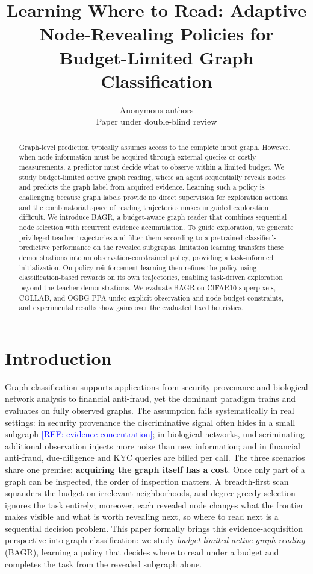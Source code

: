 \documentclass{article}
\title{Learning Where to Read: Adaptive Node-Revealing Policies for\\ Budget-Limited Graph Classification}
\author{Anonymous authors\\ Paper under double-blind review}
\newcommand{\refadd}[1]{\textcolor{blue}{[REF: #1]}}
\begin{document}
\maketitle

\begin{abstract}
Graph-level prediction typically assumes access to the complete input graph. However, when node information must be acquired through external queries or costly measurements, a predictor must decide what to observe within a limited budget. We study budget-limited active graph reading, where an agent sequentially reveals nodes and predicts the graph label from acquired evidence. Learning such a policy is challenging because graph labels provide no direct supervision for exploration actions, and the combinatorial space of reading trajectories makes unguided exploration difficult. We introduce BAGR, a budget-aware graph reader that combines sequential node selection with recurrent evidence accumulation. To guide exploration, we generate privileged teacher trajectories and filter them according to a pretrained classifier's predictive performance on the revealed subgraphs. Imitation learning transfers these demonstrations into an observation-constrained policy, providing a task-informed initialization. On-policy reinforcement learning then refines the policy using classification-based rewards on its own trajectories, enabling task-driven exploration beyond the teacher demonstrations. We evaluate BAGR on CIFAR10 superpixels, COLLAB, and OGBG-PPA under explicit observation and node-budget constraints, and experimental results show gains over the evaluated fixed heuristics.
\end{abstract}

\section{Introduction}
\label{sec:intro}

Graph classification supports applications from security provenance and biological network analysis to financial anti-fraud, yet the dominant paradigm trains and evaluates on fully observed graphs. The assumption fails systematically in real settings: in security provenance the discriminative signal often hides in a small subgraph \refadd{evidence-concentration}; in biological networks, undiscriminating additional observation injects more noise than new information; and in financial anti-fraud, due-diligence and KYC queries are billed per call. The three scenarios share one premise: \textbf{acquiring the graph itself has a cost}. Once only part of a graph can be inspected, the order of inspection matters. A breadth-first scan squanders the budget on irrelevant neighborhoods, and degree-greedy selection ignores the task entirely; moreover, each revealed node changes what the frontier makes visible and what is worth revealing next, so where to read next is a sequential decision problem. This paper formally brings this evidence-acquisition perspective into graph classification: we study \emph{budget-limited active graph reading} (BAGR), learning a policy that decides where to read under a budget and completes the task from the revealed subgraph alone.
\end{document}
